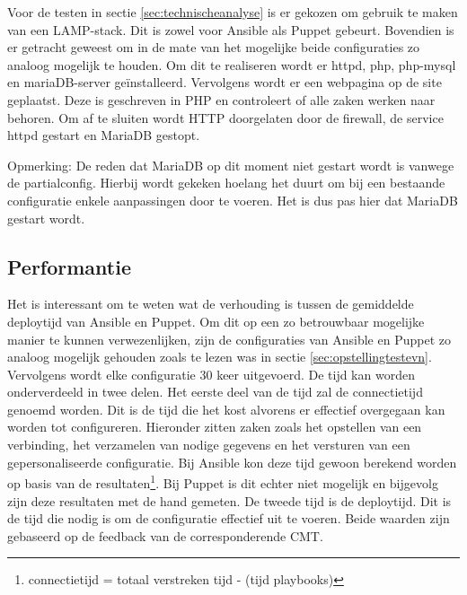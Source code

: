 Voor de testen in sectie \ref{sec:technischeanalyse} is er gekozen om gebruik te maken van een LAMP-stack. Dit is zowel voor Ansible als Puppet gebeurt. Bovendien is er getracht geweest om in de mate van het mogelijke beide configuraties zo analoog mogelijk te houden. Om dit te realiseren wordt er httpd, php, php-mysql en mariaDB-server ge\"installeerd. Vervolgens wordt er een webpagina op de site geplaatst. Deze is geschreven in PHP en controleert of alle zaken werken naar behoren. Om af te sluiten wordt HTTP doorgelaten door de firewall, de service httpd gestart en MariaDB gestopt. \newline

Opmerking: De reden dat MariaDB op dit moment niet gestart wordt is vanwege de \gls{partialconfig}. Hierbij wordt gekeken hoelang het duurt om bij een bestaande configuratie enkele aanpassingen door te voeren. Het is dus pas hier dat MariaDB gestart wordt.



 
\subsection{Performantie}

Het is interessant om te weten wat de verhouding is tussen de gemiddelde deploytijd van Ansible en Puppet. Om dit op een zo betrouwbaar mogelijke manier te kunnen verwezenlijken, zijn de configuraties van Ansible en Puppet zo analoog mogelijk gehouden zoals te lezen was in sectie \ref{sec:opstellingtestevn}. Vervolgens wordt elke configuratie 30 keer uitgevoerd. De tijd kan worden onderverdeeld in twee delen.\newline
Het eerste deel van de tijd zal de \gls{connectietijd} genoemd worden. Dit is de tijd die het kost alvorens er effectief overgegaan kan worden tot configureren. Hieronder zitten zaken zoals het opstellen van een verbinding, het verzamelen van nodige gegevens en het versturen van een gepersonaliseerde configuratie. Bij Ansible kon deze tijd gewoon berekend worden op basis van de resultaten\footnote{connectietijd = totaal verstreken tijd -  \unexpanded{$ \sum  $} (tijd playbooks)}. Bij Puppet is dit echter niet mogelijk en bijgevolg zijn deze resultaten met de hand gemeten.\newline
 De tweede tijd is de \gls{deploytijd}. Dit is de tijd die nodig is om de configuratie effectief uit te voeren. Beide waarden zijn gebaseerd op de feedback van de corresponderende \gls{CMT}.




